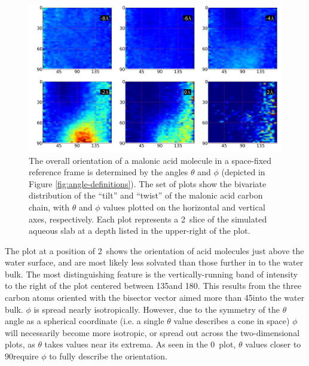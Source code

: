 \begin{figure}[h!]
	\begin{center}
		\includegraphics[scale=1.0]{images/malonic-angles/carbonbackbone-theta-phi.png}
		\caption{The overall orientation of a malonic acid molecule in a space-fixed reference frame is determined by the angles $\theta$ and $\phi$ (depicted in Figure \ref{fig:angle-definitions}). The set of plots show the bivariate distribution of the ``tilt'' and ``twist'' of the malonic acid carbon chain, with $\theta$ and $\phi$ values plotted on the horizontal and vertical axes, respectively. Each plot represents a 2\angs~slice of the simulated aqueous slab at a depth listed in the upper-right of the plot.}
		\label{fig:backbone-theta-phi}
	\end{center}
\end{figure}

The plot at a position of 2\angs~shows the orientation of acid molecules just above the water surface, and are most likely less solvated than those further in to the water bulk. The most distinguishing feature is the vertically-running band of intensity to the right of the plot centered between 135\textdegree and 180\textdegree. This results from the three carbon atoms oriented with the bisector vector aimed more than 45\textdegree into the water bulk. $\phi$ is spread nearly isotropically. However, due to the symmetry of the $\theta$ angle as a spherical coordinate (i.e. a single $\theta$ value describes a cone in space) $\phi$ will necessarily become more isotropic, or spread out across the two-dimensional plots, as $\theta$ takes values near its extrema. As seen in the 0\angs~plot, $\theta$ values closer to 90\textdegree require $\phi$ to fully describe the orientation.

